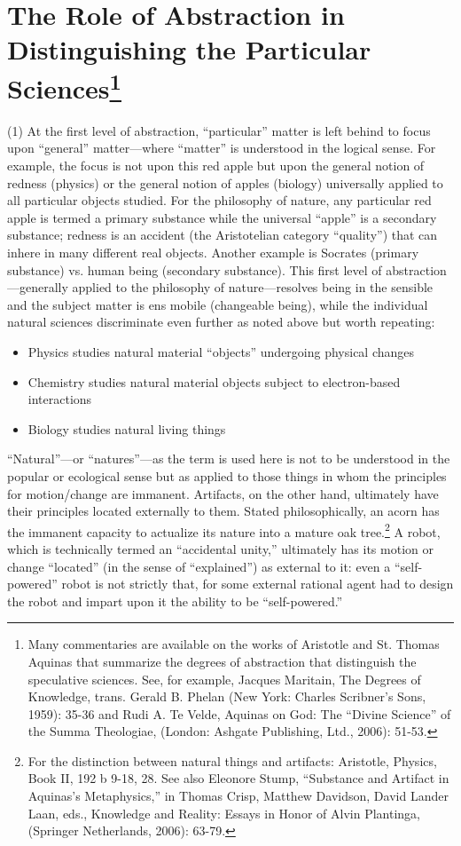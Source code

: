 \section[The Role of Abstraction in Distinguishing the Particular Sciences]{The Role of Abstraction in Distinguishing the Particular Sciences\footnote{Many commentaries are available on the works of Aristotle and St. Thomas Aquinas that summarize the degrees of abstraction that distinguish the speculative sciences. See, for example, Jacques Maritain, The Degrees of Knowledge, trans. Gerald B. Phelan (New York: Charles Scribner’s Sons, 1959): 35-36 and Rudi A. Te Velde, Aquinas on God: The ``Divine Science'' of the Summa Theologiae, (London: Ashgate Publishing, Ltd., 2006): 51-53.}}

(1) At the first level of abstraction, ``particular'' matter is left behind to focus upon ``general'' matter---where ``matter'' is understood in the logical sense. For example, the focus is not upon this red apple but upon the general notion of redness (physics) or the general notion of apples (biology) universally applied to all particular objects studied. For the philosophy of nature, any particular red apple is termed a primary substance while the universal ``apple'' is a secondary substance; redness is an accident (the Aristotelian category ``quality'') that can inhere in many different real objects. Another example is Socrates (primary substance) vs. human being (secondary substance). This first level of abstraction---generally applied to the philosophy of nature---resolves being in the sensible and the subject matter is ens mobile (changeable being), while the individual natural sciences discriminate even further as noted above but worth repeating:

\begin{itemize}
\item Physics studies natural material ``objects'' undergoing physical changes
\item Chemistry studies natural material objects subject to electron-based interactions
\item Biology studies natural living things
\end{itemize}

``Natural''---or ``natures''---as the term is used here is not to be understood in the popular or ecological sense but as applied to those things in whom the principles for motion/change are immanent. Artifacts, on the other hand, ultimately have their principles located externally to them. Stated philosophically, an acorn has the immanent capacity to actualize its nature into a mature oak tree.\footnote{For the distinction between natural things and artifacts: Aristotle, Physics, Book II, 192 b 9-18, 28. See also Eleonore Stump, ``Substance and Artifact in Aquinas’s Metaphysics,'' in Thomas Crisp, Matthew Davidson, David Lander Laan, eds., Knowledge and Reality: Essays in Honor of Alvin Plantinga, (Springer Netherlands, 2006): 63-79.} A robot, which is technically termed an ``accidental unity,'' ultimately has its motion or change ``located'' (in the sense of ``explained'') as external to it: even a ``self-powered'' robot is not strictly that, for some external rational agent had to design the robot and impart upon it the ability to be ``self-powered.''


